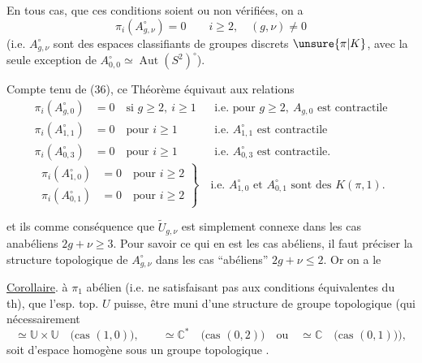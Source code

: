 En tous cas, que ces conditions soient ou non vérifiées, on a 
\[
\pi_i(A_{g,\nu}^{\circ})=0\qquad i\geq2,\quad(g,\nu)\ne0
\]
(i.e.  $A_{g,\nu}^{\circ}$ sont des espaces classifiants de groupes discrets $\unsure{\pi|K}$, avec la seule exception de $A_{0,0}^{\circ}\simeq\operatorname{Aut}(S^2)^{\circ}$).

Compte tenu de (36), ce Théorème équivaut aux relations
\[
\tag{37}
\begin{aligned}
\pi_i(A_{g,0}^{\circ})&=0\quad\text{si }g\geq2,\ i\geq1
&&\text{i.e. pour }g\geq2,\ A_{g,0}\text{ est contractile}\\
\pi_i(A_{1,1}^{\circ})&=0\quad\text{pour }i\geq1
&&\text{i.e. }A_{1,1}^{\circ}\text{ est contractile}\\
\pi_i(A_{0,3}^{\circ})&=0\quad\text{pour }i\geq1
&&\text{i.e. }A_{0,3}^{\circ}\text{ est contractile}.
\end{aligned}
\]
\[
\tag{38}
\left.\begin{aligned}
\pi_i(A_{1,0}^{\circ})&=0\quad\text{pour }i\geq2\\
\pi_i(A_{0,1}^{\circ})&=0\quad\text{pour }i\geq2
\end{aligned}\right\}
\quad\text{i.e. }A_{1,0}^{\circ}\text{ et }A_{0,1}^{\circ}\text{ sont des }K(\pi,1).
\]

et ils  comme conséquence que $\widetilde U_{g,\nu}$ est simplement connexe dans les cas anabéliens $2g+\nu\geq3$. Pour savoir ce qui en est
 les cas abéliens, il faut préciser la structure topologique de $A_{g,\nu}^{\circ}$ dans les  cas ``abéliens'' $2g+\nu\leq2$. Or on a le

\uline{Corollaire}.   à $\pi_1$ abélien (i.e. ne satisfaisant pas aux conditions équivalentes du th),  que l'esp. top. $U$  puisse,  être muni d'une structure de groupe topologique (qui  nécessairement
\[
\simeq\mathbb U\times\mathbb U\quad\text{(cas }(1,0)\text{)},\qquad
\simeq\mathbb C^*\quad\text{(cas }(0,2)\text{)}\quad\text{ou}\quad
\simeq\mathbb C\quad\text{(cas }(0,1)\text{)}),
\]
soit  d'espace homogène sous un groupe topologique .

